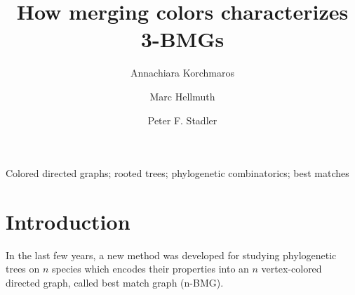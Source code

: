 \documentclass[final,3p,times]{elsarticle}
\begin{document}
\begin{frontmatter}
  \title{How merging colors characterizes 3-BMGs}

  \author[LEI]{Annachiara Korchmaros}

  \author[STOCK]{Marc Hellmuth}

  \author[LEI,LEI-other,MIS,TBI,BOG,SFI]{Peter F. Stadler}

\address[LEI]{Bioinformatics Group, Department of Computer Science \&
  Interdisciplinary Center for Bioinformatics, Universit{\"a}t Leipzig,
  H{\"a}rtelstra{\ss}e 16-18, D-04107 Leipzig, Germany}

\address[STOCK]{Department of Mathematics, Faculty of Science,
Stockholm University, SE-10691 Stockholm, Sweden}

\address[LEI-other]{German Centre for Integrative Biodiversity Research
  (iDiv) Halle-Jena-Leipzig, Competence Center for Scalable Data Services
  and Solutions Dresden-Leipzig, Leipzig Research Center for Civilization
  Diseases, and Centre for Biotechnology and Biomedicine at Leipzig
  University at Universit{\"a}t Leipzig}

\address[MIS]{Max Planck Institute for Mathematics in the Sciences,
  Inselstra{\ss}e 22, D-04103 Leipzig, Germany}

\address[TBI]{Institute for Theoretical Chemistry, University of Vienna,
  W{\"a}hringerstrasse 17, A-1090 Wien, Austria}

\address[BOG]{Facultad de Ciencias, Universidad National de Colombia, Sede
  Bogot{\'a}, Colombia}

\address[SFI]{Santa Fe Institute, 1399 Hyde Park Rd., Santa Fe NM 87501,
  USA}


\begin{abstract}
  
\end{abstract}


\begin{keyword}
 Colored directed graphs; rooted trees; phylogenetic
  combinatorics; best matches
\end{keyword}

\end{frontmatter}

\sloppy

\section{Introduction}
In the last few years, a new method was developed for studying phylogenetic trees on $n$ species which encodes their properties into an $n$ vertex-colored directed graph, called best match graph (n-BMG).
\end{document}
